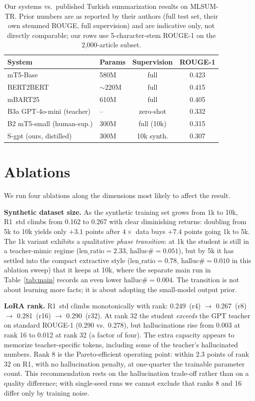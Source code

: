 \documentclass[conference]{IEEEtran}
\begin{document}
\begin{table}[t]
\centering
\caption{Our systems vs.\ published Turkish summarization results on MLSUM-TR. Prior numbers are as reported by their authors (full test set, their own stemmed ROUGE, full supervision) and are indicative only, not directly comparable; our rows use 5-character-stem ROUGE-1 on the 2{,}000-article subset.}
\label{tab:sota}
\footnotesize
\setlength{\tabcolsep}{4pt}
\begin{tabular}{llcc}
\toprule
System & Params & Supervision & ROUGE-1 \\
\midrule
mT5-Base~\cite{baykara2022trnews}  & 580M & full & 0.423 \\
BERT2BERT~\cite{baykara2022trnews} & $\sim$220M & full & 0.415 \\
mBART25~\cite{baykara2022trnews}   & 610M & full & 0.405 \\
\midrule
B3a GPT-4o-mini (teacher) & --   & zero-shot   & 0.332 \\
B2 mT5-small (human-sup.) & 300M & full (10k)  & 0.315 \\
S-gpt (ours, distilled)   & 300M & 10k synth.  & 0.307 \\
\bottomrule
\end{tabular}
\end{table}

\section{Ablations}
\label{sec:ablations}
We run four ablations along the dimensions most likely to affect the result.

\textbf{Synthetic dataset size.} As the synthetic training set grows from 1k to 10k, R1~std climbs from 0.162 to 0.267 with clear diminishing returns: doubling from 5k to 10k yields only $+3.1$ points after $4\times$ data buys $+7.4$ points going 1k to 5k. The 1k variant exhibits a qualitative \emph{phase transition}: at 1k the student is still in a teacher-mimic regime ($\mathrm{len\_ratio}{=}2.33$, $\mathrm{halluc\#}{=}0.051$), but by 5k it has settled into the compact extractive style ($\mathrm{len\_ratio}{=}0.78$, $\mathrm{halluc\#}{=}0.010$ in this ablation sweep) that it keeps at 10k, where the separate main run in Table~\ref{tab:main} records an even lower $\mathrm{halluc\#}{=}0.004$. The transition is not about learning more facts; it is about adopting the small-model output prior.

\textbf{LoRA rank.} R1~std climbs monotonically with rank: 0.249~(r4) $\to$ 0.267~(r8) $\to$ 0.281~(r16) $\to$ 0.290~(r32). At rank 32 the student \emph{exceeds} the GPT teacher on standard ROUGE-1 (0.290 vs.\ 0.278), but hallucinations rise from 0.003 at rank 16 to 0.012 at rank 32 (a factor of four). The extra capacity appears to memorize teacher-specific tokens, including some of the teacher's hallucinated numbers. Rank 8 is the Pareto-efficient operating point: within 2.3 points of rank 32 on R1, with no hallucination penalty, at one-quarter the trainable parameter count. This recommendation rests on the hallucination trade-off rather than on a quality difference; with single-seed runs we cannot exclude that ranks 8 and 16 differ only by training noise.
\end{document}
